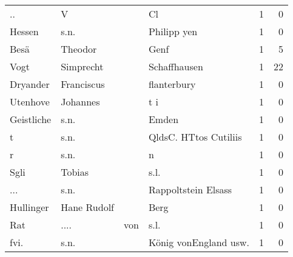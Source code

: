 \begin{center}
\begin{tiny}
\begin{longtabu}{llllrr}
                       .. &                                  V &             &                                          Cl &          1 &         0 \\
                   Hessen &                               s.n. &             &                                 Philipp yen &          1 &         0 \\
                     Besä &                            Theodor &             &                                        Genf &          1 &         5 \\
                     Vogt &                          Simprecht &             &                                Schaffhausen &          1 &        22 \\
                 Dryander &                         Franciscus &             &                                 flanterbury &          1 &         0 \\
                 Utenhove &                           Johannes &             &                                         t i &          1 &         0 \\
               Geistliche &                               s.n. &             &                                       Emden &          1 &         0 \\
                        t &                               s.n. &             &                       QldsC. HTtos Cutiliis &          1 &         0 \\
                        r &                               s.n. &             &                                           n &          1 &         0 \\
                     Sgli &                             Tobias &             &                                        s.l. &          1 &         0 \\
                      ... &                               s.n. &             &                         Rappoltstein Elsass &          1 &         0 \\
                Hullinger &                        Hane Rudolf &             &                                        Berg &          1 &         0 \\
                      Rat &                               .... &         von &                                        s.l. &          1 &         0 \\
                     fvi. &                               s.n. &             &                      König vonEngland usw.  &          1 &         0 \\

\end{longtabu}
\end{tiny}
\end{center}
